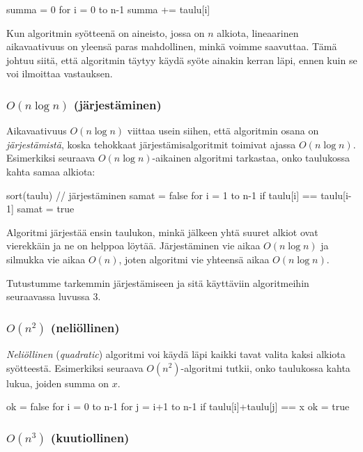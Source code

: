 \begin{code}
summa = 0
for i = 0 to n-1
    summa += taulu[i]
\end{code}

Kun algoritmin syötteenä on aineisto, jossa on $n$ alkiota,
lineaarinen aikavaativuus on yleensä paras mahdollinen,
minkä voimme saavuttaa.
Tämä johtuu siitä, että algoritmin täytyy käydä syöte
ainakin kerran läpi, ennen kuin se voi ilmoittaa vastauksen.

\subsubsection{$O(n \log n)$ (järjestäminen)}

Aikavaativuus $O(n \log n)$ viittaa usein siihen,
että algoritmin osana on \emph{järjes\-tämistä},
koska tehokkaat järjestämisalgoritmit
toimivat ajassa $O(n \log n)$.
Esimerkiksi seuraava $O(n \log n)$-aikainen
algoritmi tarkastaa, onko taulukossa kahta samaa alkiota:

\begin{code}
sort(taulu) // järjestäminen
samat = false
for i = 1 to n-1
    if taulu[i] == taulu[i-1]
        samat = true
\end{code}

Algoritmi järjestää ensin taulukon, minkä jälkeen yhtä
suuret alkiot ovat vierekkäin ja ne on helppoa löytää.
Järjestäminen vie aikaa $O(n \log n)$
ja silmukka vie aikaa $O(n)$, joten algoritmi vie
yhteensä aikaa $O(n \log n)$.

Tutustumme tarkemmin järjestämiseen ja sitä käyttäviin
algoritmeihin seuraavassa luvussa 3.


\subsubsection{$O(n^2)$ (neliöllinen)}

\emph{Neliöllinen} (\emph{quadratic}) algoritmi voi käydä läpi kaikki tavat valita
kaksi alkiota syöt\-teestä.
Esimerkiksi seuraava $O(n^2)$-algoritmi tutkii, onko taulukossa
kahta lukua, joiden summa on $x$.

\begin{code}
ok = false
for i = 0 to n-1
    for j = i+1 to n-1
        if taulu[i]+taulu[j] == x
            ok = true
\end{code}


\subsubsection{$O(n^3)$ (kuutiollinen)}

